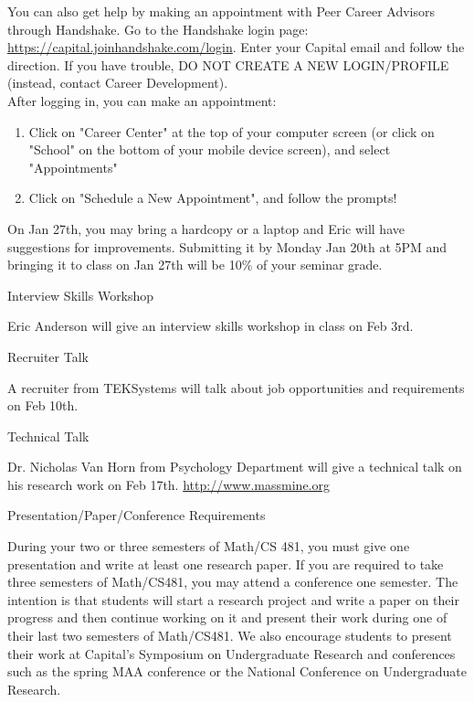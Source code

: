 \documentclass[11pt]{article}
\begin{document}
You can also get help by making an appointment with Peer Career Advisors through Handshake. Go to the Handshake login page: \url{https://capital.joinhandshake.com/login}. Enter your Capital email and follow the direction. If you have trouble, DO NOT CREATE A NEW LOGIN/PROFILE (instead, contact Career Development).\\

After logging in, you can make an appointment:
\begin{enumerate}
\item
Click on "Career Center" at the top of your computer screen (or click on "School" on the bottom of your mobile device screen), and select "Appointments"
\item
Click on "Schedule a New Appointment", and follow the prompts!
\end{enumerate}
On Jan 27th, you may bring a hardcopy or a laptop and Eric will have suggestions for improvements. Submitting it by Monday Jan 20th at 5PM and bringing it to class on Jan 27th will be 10\% of your seminar grade.

\flushleft
\begin{bfseries} Interview Skills Workshop\end{bfseries}

Eric Anderson will give an interview skills workshop in class on Feb 3rd.


\flushleft
\begin{bfseries} Recruiter Talk\end{bfseries}

A recruiter from TEKSystems will talk about job opportunities and requirements on Feb 10th.

\flushleft
\begin{bfseries} Technical Talk\end{bfseries}

Dr. Nicholas Van Horn from Psychology Department will give a technical talk on his research work on Feb 17th. 
\url{http://www.massmine.org}



\flushleft
\begin{bfseries}Presentation/Paper/Conference Requirements\end{bfseries}

During your two or three semesters of Math/CS 481, you must give one presentation and write at least one research paper. If you are required to take three semesters of Math/CS481, you may attend a conference one semester. The intention is that students will start a research project and write a paper on their progress and then continue working on it and present their work during one of their last two semesters of Math/CS481. We also encourage students to present their work at Capital's Symposium on Undergraduate Research and conferences such as the spring MAA conference or the National Conference on Undergraduate Research.
\end{document}
